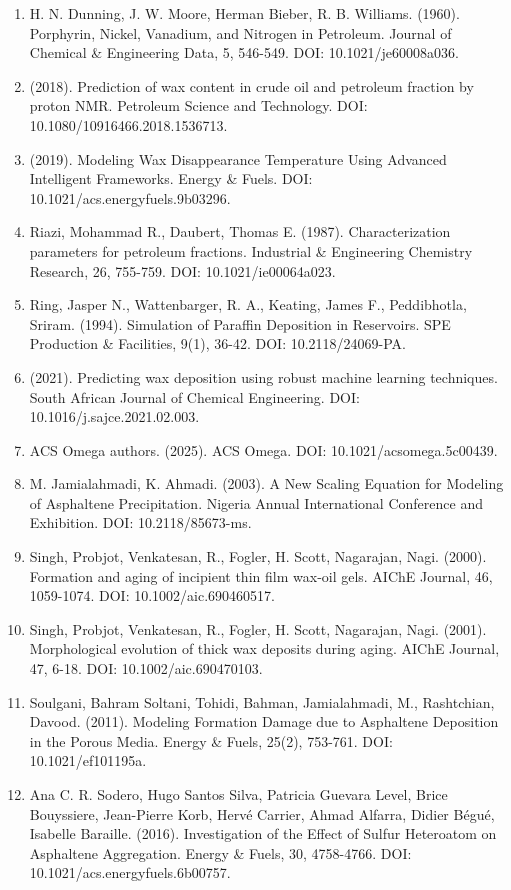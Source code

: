 \documentclass[11pt]{extarticle}
\begin{document}
\begin{enumerate}
\item
  H. N. Dunning, J. W. Moore, Herman Bieber, R. B. Williams. (1960). Porphyrin, Nickel, Vanadium, and Nitrogen in Petroleum. Journal of Chemical \& Engineering Data, 5, 546-549. DOI: 10.1021/je60008a036.
\item
  (2018). Prediction of wax content in crude oil and petroleum fraction by proton NMR. Petroleum Science and Technology. DOI: 10.1080/10916466.2018.1536713.
\item
  (2019). Modeling Wax Disappearance Temperature Using Advanced Intelligent Frameworks. Energy \& Fuels. DOI: 10.1021/acs.energyfuels.9b03296.
\item
  Riazi, Mohammad R., Daubert, Thomas E. (1987). Characterization parameters for petroleum fractions. Industrial \& Engineering Chemistry Research, 26, 755-759. DOI: 10.1021/ie00064a023.
\item
  Ring, Jasper N., Wattenbarger, R. A., Keating, James F., Peddibhotla, Sriram. (1994). Simulation of Paraffin Deposition in Reservoirs. SPE Production \& Facilities, 9(1), 36-42. DOI: 10.2118/24069-PA.
\item
  (2021). Predicting wax deposition using robust machine learning techniques. South African Journal of Chemical Engineering. DOI: 10.1016/j.sajce.2021.02.003.
\item
  ACS Omega authors. (2025). ACS Omega. DOI: 10.1021/acsomega.5c00439.
\item
  M. Jamialahmadi, K. Ahmadi. (2003). A New Scaling Equation for Modeling of Asphaltene Precipitation. Nigeria Annual International Conference and Exhibition. DOI: 10.2118/85673-ms.
\item
  Singh, Probjot, Venkatesan, R., Fogler, H. Scott, Nagarajan, Nagi. (2000). Formation and aging of incipient thin film wax‐oil gels. AIChE Journal, 46, 1059-1074. DOI: 10.1002/aic.690460517.
\item
  Singh, Probjot, Venkatesan, R., Fogler, H. Scott, Nagarajan, Nagi. (2001). Morphological evolution of thick wax deposits during aging. AIChE Journal, 47, 6-18. DOI: 10.1002/aic.690470103.
\item
  Soulgani, Bahram Soltani, Tohidi, Bahman, Jamialahmadi, M., Rashtchian, Davood. (2011). Modeling Formation Damage due to Asphaltene Deposition in the Porous Media. Energy \& Fuels, 25(2), 753-761. DOI: 10.1021/ef101195a.
\item
  Ana C. R. Sodero, Hugo Santos Silva, Patricia Guevara Level, Brice Bouyssiere, Jean-Pierre Korb, Hervé Carrier, Ahmad Alfarra, Didier Bégué, Isabelle Baraille. (2016). Investigation of the Effect of Sulfur Heteroatom on Asphaltene Aggregation. Energy \& Fuels, 30, 4758-4766. DOI: 10.1021/acs.energyfuels.6b00757.

\end{enumerate}
\end{document}
